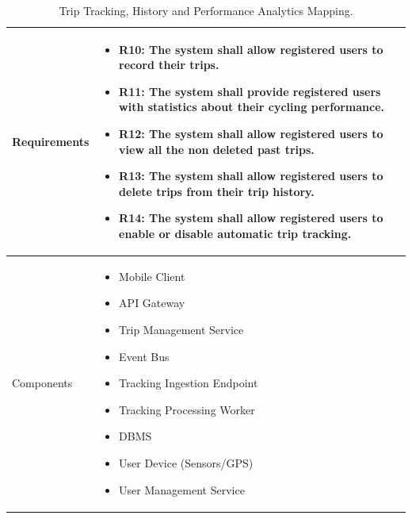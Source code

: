 \begin{table}[H]
    \centering
    \renewcommand{\arraystretch}{1.3}
    \begin{tabular}{|p{}|p{}|}
        \hline
        Requirements & \begin{itemize}[topsep=0pt, partopsep=0pt, leftmargin=*]
            \item R10: The system shall allow registered users to record their trips.
            \item R11: The system shall provide registered users with statistics about their cycling performance.
            \item R12: The system shall allow registered users to view all the non deleted past trips.
            \item R13: The system shall allow registered users to delete trips from their trip history.
            \item R14: The system shall allow registered users to enable or disable automatic trip tracking.
        \end{itemize} \\
        \hline
        Components & \begin{itemize}[topsep=0pt, partopsep=0pt, leftmargin=*] 
            \item Mobile Client
            \item API Gateway
            \item Trip Management Service
            \item Event Bus
            \item Tracking Ingestion Endpoint
            \item Tracking Processing Worker
            \item DBMS
            \item User Device (Sensors/GPS)
            \item User Management Service
        \end{itemize} \\
        \hline
    \end{tabular}
    \caption{Trip Tracking, History and Performance Analytics Mapping.}
    \label{tab:trip_tracking_mapping}
\end{table}

